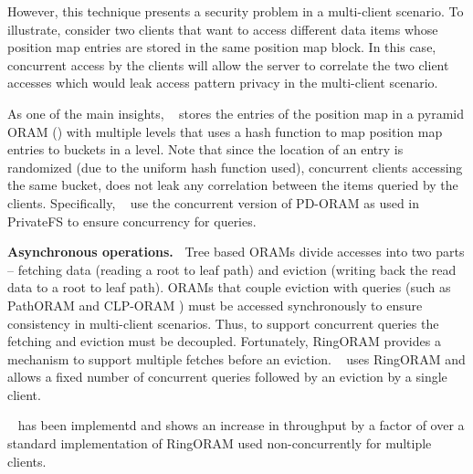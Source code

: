  
  
  However, this technique presents a security problem in a multi-client scenario. To illustrate, consider two clients that want 
  to access different data items whose position map entries are stored in the same position map block. In this case, concurrent access by the 
  clients will allow the server to correlate the two client accesses which would leak access pattern privacy in the multi-client scenario. 
  
  As one of the main insights, \sysname~ stores the entries of the position map in a pyramid 
  ORAM (\cite{goldreich,privatefs}) with multiple levels that uses a hash function to map position map 
  entries to buckets in a level. 
  Note that since the location of an entry is randomized 
  (due to the uniform hash function used), concurrent clients 
  accessing the same bucket, does not leak any correlation between the items queried by the clients. Specifically, \sysname~ use the concurrent 
  version of PD-ORAM as used in PrivateFS \cite{privatefs} to ensure concurrency for queries.

  {\bf Asynchronous operations.~}
  Tree based ORAMs divide accesses into two parts -- fetching data (reading a root to leaf path) and eviction (writing back 
  the read data to a root to leaf path). ORAMs that couple eviction with queries (such as PathORAM \cite{pathoram} and 
  CLP-ORAM \cite{clporam}) must be accessed synchronously to ensure consistency in multi-client scenarios. 
  Thus, to support concurrent queries the 
  fetching and eviction must be decoupled. Fortunately, RingORAM \cite{ringoram} provides a 
  mechanism to support multiple fetches before an eviction. 
  \sysname~ uses RingORAM and allows a fixed number of concurrent queries followed
  by an eviction by a single client. 

  \sysname~ has been implementd and 
  shows an increase in throughput by a factor of  
  over a standard implementation of 
  RingORAM \cite{ringoram} used non-concurrently for multiple clients.  
